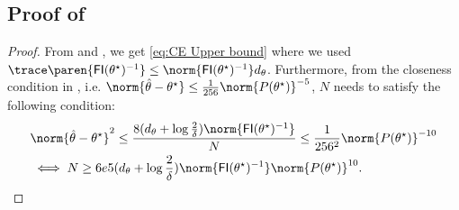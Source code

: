 \subsection{Proof of \texorpdfstring{}{}}
\label{subsec: Proof of CE upper bound}
\begin{proof}
    From  and , we get \eqref{eq:CE Upper bound} where we used $\trace\paren{\mathsf{FI}(\theta^\star)^{-1}}\leq\norm{\mathsf{FI}(\theta^\star)^{-1}}d_\theta$. Furthermore, from the closeness condition in , i.e.  $\norm{\hat\theta-\theta^\star}\leq\frac{1}{256}\norm{P(\theta^\star)}^{-5}$, $N$ needs to satisfy the following condition:
    \begin{align*}
        &\norm{\hat\theta-\theta^\star}^2 \leq \frac{8(d_\theta+\log\frac{2}{\delta})\norm{\mathsf{FI}(\theta^\star)^{-1}}}{N}\leq\frac{1}{256^2}\norm{P(\theta^\star)}^{-10} \\
        &\iff N \geq 6e5(d_\theta+\log\frac{2}{\delta})\norm{\mathsf{FI}(\theta^\star)^{-1}}\norm{P(\theta^\star)}^{10}.
    \end{align*}
\end{proof}